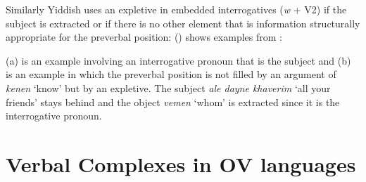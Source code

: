 Similarly Yiddish uses an expletive in embedded interrogatives (\emph{w} + V2) if the subject is
extracted or if there is no other element that is information structurally appropriate for the preverbal position:
() shows examples from \citet[--404]{Prince89a}:

\eal
{}
\zl
(a) is an example involving an interrogative pronoun that is the subject and (b) is an
example in which the preverbal position is not filled by an argument of \emph{kenen} `know' but by
an expletive. The subject \emph{ale dayne khaverim} `all your friends' stays behind and the object
\emph{vemen} `whom' is extracted since it is the interrogative pronoun.



\section{Verbal Complexes in OV languages}


